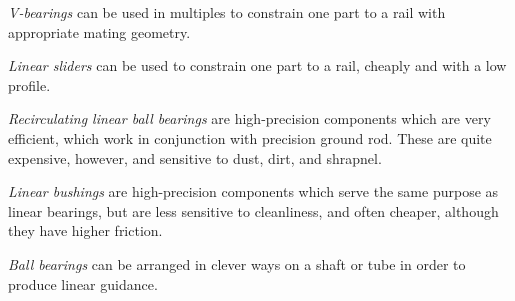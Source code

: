 \documentclass[10pt,letterpaper]{book}
\begin{document}
	\begin{asparaenum}[a)]
		\item \textit{V-bearings} can be used in multiples to constrain one part to a rail with appropriate mating geometry.
		\item \textit{Linear sliders} can be used to constrain one part to a rail, cheaply and with a low profile.
		\item \textit{Recirculating linear ball bearings} are high-precision components which are very efficient, which work in conjunction with precision ground rod. These are quite expensive, however, and sensitive to dust, dirt, and shrapnel.
		\item \textit{Linear bushings} are high-precision components which serve the same purpose as linear bearings, but are less sensitive to cleanliness, and often cheaper, although they have higher friction.
		\item \textit{Ball bearings} can be arranged in clever ways on a shaft or tube in order to produce linear guidance.
	\end{asparaenum}
\end{document}
